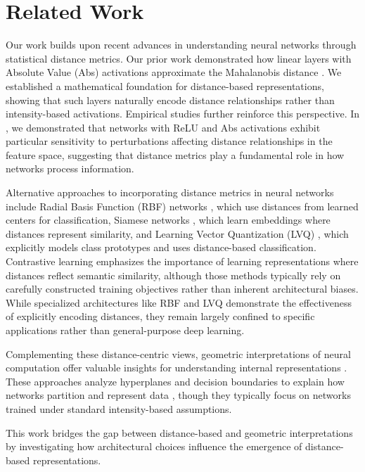 \section{Related Work}
\label{sec:related_work}

Our work builds upon recent advances in understanding neural networks through statistical distance metrics. Our prior work \cite{oursland2024interpreting} demonstrated how linear layers with Absolute Value (Abs) activations approximate the Mahalanobis distance \cite{mahalanobis1936generalized}. We established a mathematical foundation for distance-based representations, showing that such layers naturally encode distance relationships rather than intensity-based activations. Empirical studies further reinforce this perspective. In \cite{oursland2024neural}, we demonstrated that networks with ReLU and Abs activations exhibit particular sensitivity to perturbations affecting distance relationships in the feature space, suggesting that distance metrics play a fundamental role in how networks process information.

Alternative approaches to incorporating distance metrics in neural networks include Radial Basis Function (RBF) networks \cite{broomhead1988radial, park1991universal}, which use distances from learned centers for classification, Siamese networks \cite{bromley1994signature, hadsell2006dimensionality}, which learn embeddings where distances represent similarity, and Learning Vector Quantization (LVQ) \cite{kohonen1995learning}, which explicitly models class prototypes and uses distance-based classification. Contrastive learning \cite{chen2020simple, he2020momentum} emphasizes the importance of learning representations where distances reflect semantic similarity, although those methods typically rely on carefully constructed training objectives rather than inherent architectural biases. While specialized architectures like RBF and LVQ demonstrate the effectiveness of explicitly encoding distances, they remain largely confined to specific applications rather than general-purpose deep learning.

Complementing these distance-centric views, geometric interpretations of neural computation offer valuable insights for understanding internal representations \cite{montavon2018methods, olah2017feature}. These approaches analyze hyperplanes and decision boundaries to explain how networks partition and represent data \cite{lipton2018mythos, erhan2009visualizing}, though they typically focus on networks trained under standard intensity-based assumptions.

This work bridges the gap between distance-based and geometric interpretations by investigating how architectural choices influence the emergence of distance-based representations.
